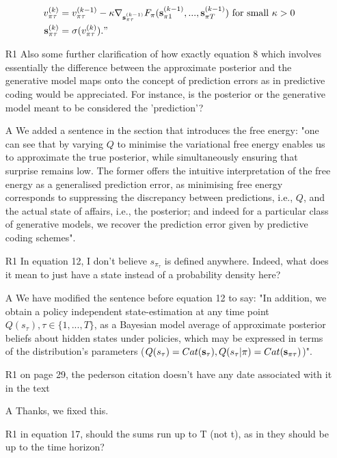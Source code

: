 \documentclass{article}
\begin{document}
\begin{itemize}
  	\begin{equation*}
  	    \begin{split}
  	         v_{\pi \tau}^{(k)}&= v_{\pi \tau}^{(k-1)} -\kappa \nabla_{\bold s^{(k-1)}_{\pi\tau}} F_\pi(\bold s^{(k-1)}_{\pi 1},...,\bold s^{(k-1)}_{\pi T}) \text{ for small } \kappa >0 \\
  	        \bold s_{\pi\tau}^{(k)} &= \sigma (v_{\pi \tau}^{(k)})."
  	    \end{split}
  	\end{equation*}
    \item[R1] Also some further clarification of how exactly equation 8 which involves essentially the difference between the approximate posterior and the generative model maps onto the concept of prediction errors as in predictive coding would be appreciated. For instance, is the posterior or the generative model meant to be considered the 'prediction'?
    \item[A] We added a sentence in the section that introduces the free energy: "one can see that by varying $Q$ to minimise the variational free energy enables us to approximate the true posterior, while simultaneously ensuring that surprise remains low. The former offers the intuitive interpretation of the free energy as a generalised prediction error, as minimising free energy corresponds to suppressing the discrepancy between predictions, i.e., $Q$, and the actual state of affairs, i.e., the posterior; and indeed for a particular class of generative models, we recover the prediction error given by predictive coding schemes".
    \item[R1] In equation 12, I don't believe $s_\pi_\tau$ is defined anywhere. Indeed, what does it mean to just have a state instead of a probability density here?
    \item[A] We have modified the sentence before equation 12 to say: "In addition, we obtain a policy independent state-estimation at any time point $Q(s_\tau),\tau \in \{1,...,T\}$, as a Bayesian model average of approximate posterior beliefs about hidden states under policies, which may be expressed in terms of the distribution's parameters ($Q(s_\tau)= Cat(\bold s_\tau),Q(s_\tau |\pi)= Cat(\bold s_{\pi\tau})$)".
    \item[R1] on page 29, the pederson citation doesn't have any date associated with it in the text
    \item[A] Thanks, we fixed this.
    \item[R1] in equation 17, should the sums run up to T (not t), as in they should be up to the time horizon?

\end{itemize}
\end{document}
